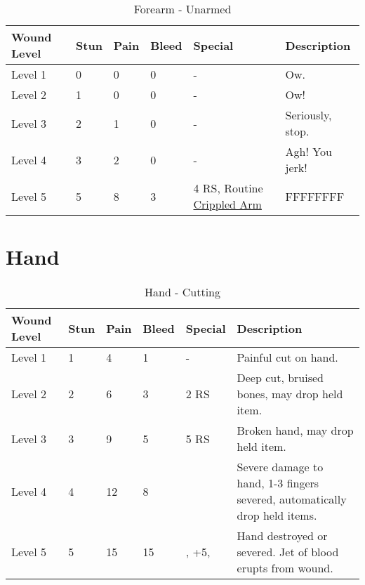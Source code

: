 \documentclass[oneside,11pt,english]{book}
\begin{document}
\begin{table}[!hb] %
	\caption{Forearm - Unarmed}
	\label{wound:Forearm - Unarmed}
	\begin{tabu} to 
Wound Level &Stun &Pain &Bleed &Special &Description\\\toprule
Level 1& 0& 0& 0& - &Ow.\\
Level 2& 1& 0& 0& - &Ow!\\
Level 3& 2& 1& 0& - &Seriously, stop.\\
Level 4& 3& 2& 0& - &Agh! You jerk!\\
Level 5& 5& 8& 3
	& 4 RS, \newline
		Routine  \hyperref[bane:Crippled Limb/Appendage]{Crippled Arm}
	&FFFFFFFF \\
	\end{tabu}
\end{table}
\clearpage

\section{Hand} \vspace{-25pt} \label{sec:hand}
\begin{table}[!hb] %
	\caption{Hand - Cutting}
	\label{wound:Hand - Cutting}
	\begin{tabu} to 
Wound Level &Stun &Pain &Bleed &Special &Description\\\toprule
Level 1& 1& 4& 1& - &Painful cut on hand.\\
Level 2& 2& 6& 3&  2 RS &Deep cut, bruised bones, may drop held item.\\
Level 3& 3& 9& 5&  5 RS &Broken hand, may drop held item.\\
Level 4& 4& 12& 8&  &Severe damage to hand, 1-3 fingers severed, automatically drop held items.\\
Level 5& 5& 15& 15
	&, \newline
		 +5, \newline
	&Hand destroyed or severed. Jet of blood erupts from wound.\\
	\end{tabu}
\end{table}
\end{document}
